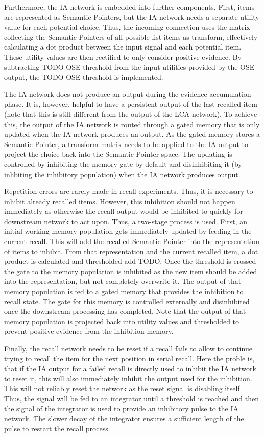 Furthermore, the IA network is embedded into further components.
First, items are represented as Semantic Pointers, but the IA network needs a separate utility value for each potential choice.
Thus, the incoming connection uses the matrix collecting the Semantic Pointers of all possible list items as transform, effectively calculating a dot product between the input signal and each potential item.
These utility values are then rectified to only consider positive evidence.
By subtracting TODO OSE threshold from the input utilities provided by the OSE output, the TODO OSE threshold is implemented.

The IA network does not produce an output during the evidence accumulation phase.
It is, however, helpful to have a persistent output of the last recalled item (note that this is still different from the output of the LCA network).
To achieve this, the output of the IA network is routed through a gated memory that is only updated when the IA network produces an output.
As the gated memory stores a Semantic Pointer, a transform matrix needs to be applied to the IA output to project the choice back into the Semantic Pointer space.
The updating is controlled by inhibiting the memory gate by default and disinhibiting it (by inhbiting the inhibitory population) when the IA network produces output.

Repetition errors are rarely made in recall experiments.
Thus, it is necessary to inhibit already recalled items.
However, this inhibition should not happen immediately as otherwise the recall output would be inhibited to quickly for downstream network to act upon.
Thus, a two-stage process is used.
First, an initial working memory population gets immediately updated by feeding in the current recall.
This will add the recalled Semantic Pointer into the representation of items to inhibit.
From that representation and the current recalled item, a dot product is calculated and thresholded add TODO\@.
Once the threshold is crossed the gate to the memory population is inhibited as the new item should be added into the representation, but not completely overwrite it.
The output of that memory population is fed to a gated memory that provides the inhibition to recall state.
The gate for this memory is controlled externally and disinhibited once the downstream processing has completed.
Note that the output of that memory population is projected back into utility values and thresholded to prevent positive evidence from the inhibition memory.

Finally, the recall network needs to be reset if a recall fails to allow to continue trying to recall the item for the next position in serial recall.
Here the proble is, that if the IA output for a failed recall is directly used to inhibit the IA network to reset it, this will also immediately inhibit the output used for the inhibition.
This will not reliably reset the network as the reset signal is disabling itself.
Thus, the signal will be fed to an integrator until a threshold is reached and then the signal of the integrator is used to provide an inhibitory pulse to the IA network.
The slower decay of the integrator ensures a sufficient length of the pulse to restart the recall process.
